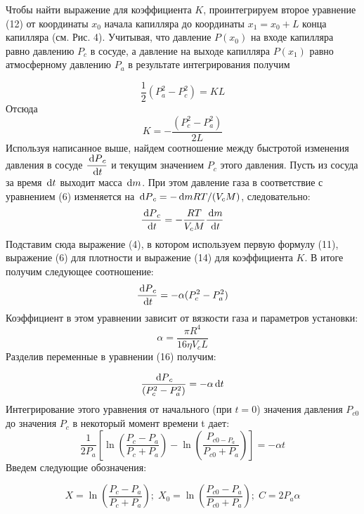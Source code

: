 \documentclass[a4paper]{article}
\begin{document}
Чтобы найти выражение для коэффициента $K$, проинтегрируем
второе уравнение (12) от координаты $x_0$ начала капилляра до координаты $x_1=x_0+L$ конца капилляра (см. Рис. 4). Учитывая,
что давление $P(x_0)$ на входе капилляра равно давлению $P_c$ в сосуде, а давление на выходе капилляра $P(x_1)$ равно атмосферному
давлению $P_a$ в результате интегрирования получим

\begin{equation}
    \dfrac{1}{2}\left(P_a^2-P_c^2\right) = KL
\end{equation}
Отсюда
\begin{equation}
    K = -\dfrac{(P_c^2-P_a^2)}{2L}
\end{equation}
Используя написанное выше, найдем соотношение между быстротой изменения давления в сосуде $\dfrac{\dl P_c}{\dl t}$ и текущим значением $P_c$ 
этого давления. Пусть из сосуда за время $\dl t$ выходит масса $\dl m$.
При этом давление газа в соответствие с уравнением (6) изменяется на $\dl P_c = -\dl m RT/(V_cM)$, следовательно:
\begin{equation}
    \dfrac{\dl P_c}{\dl t} = -\dfrac{RT}{V_cM}\dfrac{\dl m}{\dl t}
\end{equation}
Подставим сюда выражение (4), в котором используем первую
формулу (11), выражение (6) для плотности и выражение (14)
для коэффициента $K$. В итоге получим следующее соотношение:
\begin{equation}
    \dfrac{\dl P_c}{\dl t} = -\alpha(P_c^2-P_a^2)
\end{equation}
Коэффициент в этом уравнении зависит от вязкости газа и параметров установки:
\begin{equation}
\alpha = \dfrac{\pi R^4}{16\eta V_cL}
\end{equation}
Разделив переменные в уравнении (16) получим:

\begin{equation}
    \dfrac{\dl P_c}{(P_c^2-P_a^2)}=-\alpha \dl t
\end{equation}
Интегрирование этого уравнения от начального (при $t = 0$) значения давления $P_{c0}$ до значения $P_c$ в некоторый момент времени t дает: 
\begin{equation}
    \dfrac{1}{2P_a}\left[\ln \left(\dfrac{P_c-P_a}{P_c+P_a}\right) - \ln \left(\dfrac{P_{c0-P_a}}{P_{c0}+P_a} \right)\right]=-\alpha t 
\end{equation}
Введем следующие обозначения:

\begin{equation}
    X = \ln \left(\dfrac{P_c-P_a}{P_c+P_a} \right); \; X_0 = \ln\left(\dfrac{P_{c0}-P_{a}}{P_{c0}+P_a} \right); \; C = 2P_a\alpha
\end{equation}
\end{document}
